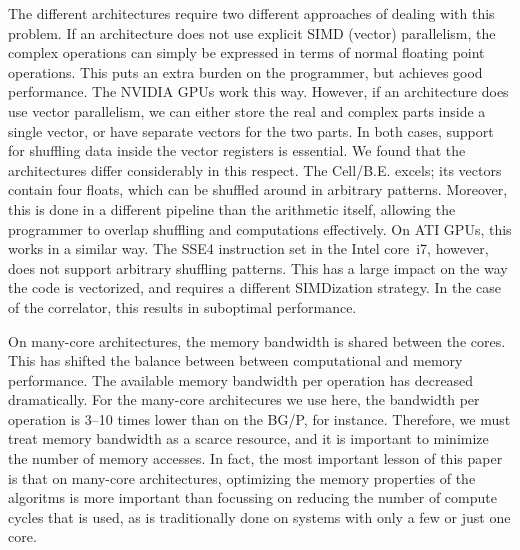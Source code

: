 \documentclass{article}
\begin{document}
The different architectures require two different approaches of
dealing with this problem. If an architecture does not use
explicit SIMD (vector) parallelism, the complex operations can simply
be expressed in terms of normal floating point operations. This puts
an extra burden on the programmer, but achieves good performance. The
NVIDIA GPUs work this way.  However, if an architecture does use vector
parallelism, we can either store the real and complex parts inside a
single vector, or have separate vectors for the two parts.  In both
cases, support for shuffling data inside the vector registers is
essential. We found that the architectures differ considerably in this
respect.  The Cell/B.E. excels; its vectors contain four floats, which
can be shuffled around in arbitrary patterns. Moreover, this is done
in a different pipeline than the arithmetic itself, allowing the
programmer to overlap shuffling and computations effectively.  On ATI
GPUs, this works in a similar way.  The SSE4 instruction set in the
Intel core~i7, however, does not support arbitrary shuffling patterns.
This has a large impact on the way the code is vectorized, and
requires a different SIMDization strategy. In the case of the
correlator, this results in suboptimal performance.




On many-core architectures, the memory bandwidth is shared between the
cores.  This has shifted the balance between between computational
and memory performance.  The available memory bandwidth per
operation has decreased dramatically.  For the many-core architecures
we use here, the bandwidth per operation is 3--10 times lower than on
the BG/P, for instance.  Therefore, we must treat memory bandwidth as
a scarce resource, and it is important to minimize the number of
memory accesses.  In fact, the most important lesson of this paper is that on many-core architectures,
optimizing the memory properties of the algoritms is more important
than focussing on reducing the number of compute cycles that is used,
as is traditionally done on systems with only a few or just one core.
\end{document}
